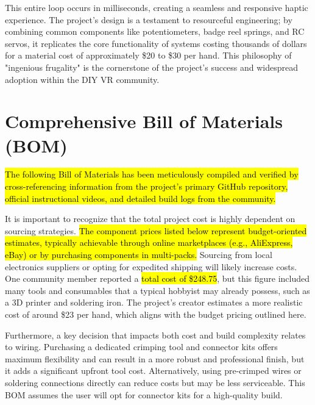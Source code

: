 \documentclass{article}
\begin{document}
This entire loop occurs in milliseconds, creating a seamless and responsive haptic experience. The project's design is a testament to resourceful engineering; by combining common components like potentiometers, badge reel springs, and RC servos, it replicates the core functionality of systems costing thousands of dollars for a material cost of approximately \$20 to \$30 per hand. This philosophy of "ingenious frugality" is the cornerstone of the project's success and widespread adoption within the DIY VR community.

\newpage
\section{Comprehensive Bill of Materials (BOM)}
\hl{The following Bill of Materials has been meticulously compiled and verified by cross-referencing information from the project's primary GitHub repository, official instructional videos, and detailed build logs from the community.}

It is important to recognize that the total project cost is highly dependent on sourcing strategies. \hl{The component prices listed below represent budget-oriented estimates, typically achievable through online marketplaces (e.g., AliExpress, eBay) or by purchasing components in multi-packs.} Sourcing from local electronics suppliers or opting for expedited shipping will likely increase costs. One community member reported a \hl{total cost of \$248.75}, but this figure included many tools and consumables that a typical hobbyist may already possess, such as a 3D printer and soldering iron. The project's creator estimates a more realistic cost of around \$23 per hand, which aligns with the budget pricing outlined here.

Furthermore, a key decision that impacts both cost and build complexity relates to wiring. Purchasing a dedicated crimping tool and connector kits offers maximum flexibility and can result in a more robust and professional finish, but it adds a significant upfront tool cost. Alternatively, using pre-crimped wires or soldering connections directly can reduce costs but may be less serviceable. This BOM assumes the user will opt for connector kits for a high-quality build.
\end{document}
